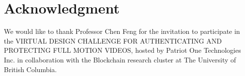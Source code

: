 \documentclass[conference]{IEEEtran}
\begin{document}
\section*{Acknowledgment}
We would like to thank Professor Chen Feng for the invitation to participate in the VIRTUAL DESIGN CHALLENGE FOR AUTHENTICATING  AND  PROTECTING  FULL  MOTION  VIDEOS, hosted by Patriot One Technologies Inc. in collaboration with the Blockchain research cluster at The University of British Columbia.
{}

\end{document}

